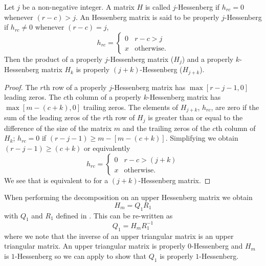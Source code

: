 \begin{thm}
    Let $j$ be a non-negative integer.  A matrix $H$ is called $j$-Hessenberg if $h_{rc} = 0$ whenever $(r-c)>j$.  An Hessenberg matrix is said to be properly $j$-Hessenberg if $h_{rc} \neq 0$ whenever $\left(r-c\right) = j$,
    \begin{equation}
        h_{rc} = \begin{cases}
            0 & r-c > j \\
            x & \text{otherwise}.
        \end{cases}
        \label{eq:hrcDefined}
    \end{equation}
    Then the product of a properly $j$-Hessenberg matrix ($H_j$) and a properly $k$-Hessenberg matrix $H_k$ is properly $(j+k)$-Hessenberg ($H_{j+k}$).
    \label{thm:jkHessenberg}
\end{thm}
\begin{proof}
    The $r$th row of a properly $j$-Hessenberg matrix has $\max\left[r-j-1,0\right]$ leading zeros.  The $c$th column of a properly $k$-Hessenberg matrix has $\max\left[m-\left(c+k\right),0\right]$ trailing zeros. The elements of $H_{j+k}$, $h_{rc}$, are zero if the sum of the leading zeros of the $r$th row of $H_j$ is greater than or equal to the difference of the size of the matrix $m$ and the trailing zeros of the $c$th column of $H_k$; \mbox{$h_{rc} = 0$} if \mbox{$\left( r-j-1 \right) \geq m-\left[m-\left(c+k\right)\right]$}.  Simplifying we obtain \mbox{$\left( r-j-1 \right) \geq \left(c+k\right)$} or equivalently
    \begin{equation}
        h_{rc} = \begin{cases}
            0 & r-c > \left(j+k\right) \\
            x & \text{otherwise}.
        \end{cases}
        \label{eq:hrcProved}
    \end{equation}
    We see that  is equivalent to  for a $\left(j+k\right)$-Hessenberg matrix.
\end{proof}

When performing the \QR decomposition on an upper Hessenberg matrix we obtain
\begin{equation}
    H_m = Q_1R_1
    \label{eq:HQR}
\end{equation}
with $Q_1$ and $R_1$ defined in .  This can be re-written as
\begin{equation}
    Q_1 = H_mR_1^{-1}
\end{equation}
where we note that the inverse of an upper triangular matrix is an upper triangular matrix.  An upper triangular matrix is properly $0$-Hessenberg and $H_m$ is $1$-Hessenberg so we can apply  to show that $Q_1$ is properly $1$-Hessenberg.  


